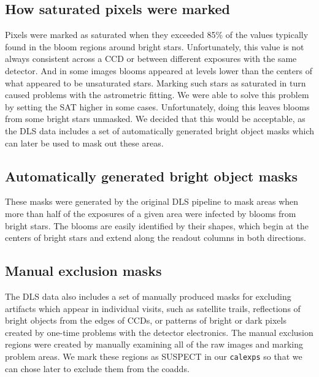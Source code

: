 \documentclass[DM,toc]{lsstdoc}
\begin{document}
\subsection{How saturated pixels were marked}
Pixels were marked as saturated when they exceeded 85\% of the values typically found in the bloom regions around bright stars. Unfortunately, this value is not always consistent across a CCD or between different exposures with the same detector. And in some images blooms appeared at levels lower than the centers of what appeared to be unsaturated stars. Marking such stars as saturated in turn caused problems with the astrometric fitting.
We were able to solve this problem by setting the SAT higher in some cases. Unfortunately, doing this leaves blooms from some bright stars unmasked. We decided that this would be acceptable, as the DLS data includes a set of automatically generated bright object masks which can later be used to mask out these areas.

\subsection{Automatically generated bright object masks}
These masks were generated by the original DLS pipeline to mask areas when more than half of the exposures of a given area were infected by blooms from bright stars. The blooms are easily identified by their shapes, which begin at the centers of bright stars and extend along the readout columns in both directions.

\subsection{Manual exclusion masks}
The DLS data also includes a set of manually produced masks for excluding artifacts which appear in individual visits, such as satellite trails, reflections of bright objects from the edges of CCDs, or patterns of bright or dark pixels created by one-time problems with the detector electronics. The manual exclusion regions were created by manually examining all of the raw images and marking problem areas.
We mark these regions as SUSPECT in our {\tt\string calexps} so that we can chose later to exclude them from the coadds.
\end{document}
